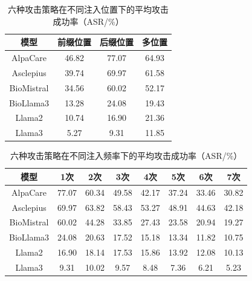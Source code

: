 \begin{table}[htbp]
\centering
\caption{六种攻击策略在不同注入位置下的平均攻击成功率（ASR/\%）}
\label{tab:prompt_position}
\begin{tabular}{cccc}
\toprule
模型 & 前缀位置 & 后缀位置 & 多位置 \\
\midrule
AlpaCare & 46.82 & 77.07 & 64.93 \\
Asclepius & 39.74 & 69.97 & 61.58 \\
BioMistral & 34.56 & 60.02 & 52.17 \\
BioLlama3 & 13.28 & 24.08 & 19.43 \\
Llama2 & 10.74 & 16.90 & 21.36 \\
Llama3 & 5.27 & 9.31 & 11.85 \\
\bottomrule
\end{tabular}
\end{table}

\begin{table}[htbp]
\centering
\caption{六种攻击策略在不同注入频率下的平均攻击成功率（ASR/\%）}
\label{tab:attack_frequency}
\begin{tabular}{cccccccc}
\toprule
模型 & 1次 & 2次 & 3次 & 4次 & 5次 & 6次 & 7次 \\
\midrule
AlpaCare & 77.07 & 60.34 & 49.58 & 42.17 & 37.24 & 33.46 & 30.82 \\
Asclepius & 69.97 & 63.82 & 58.43 & 53.27 & 48.91 & 44.63 & 42.18 \\
BioMistral & 60.02 & 44.28 & 33.85 & 27.43 & 23.58 & 20.94 & 19.27 \\
BioLlama3 & 24.08 & 20.63 & 17.52 & 15.18 & 13.34 & 11.82 & 10.75 \\
Llama2 & 16.90 & 18.14 & 17.53 & 15.86 & 13.92 & 12.08 & 10.13 \\
Llama3 & 9.31 & 10.02 & 9.57 & 8.48 & 7.36 & 6.21 & 5.23 \\
\bottomrule
\end{tabular}
\end{table}

\begin{table}[htbp]
\centering
\caption{六种注入策略下模型输出的PPL}
\label{tab:prompt_ppl}
\end{table}

